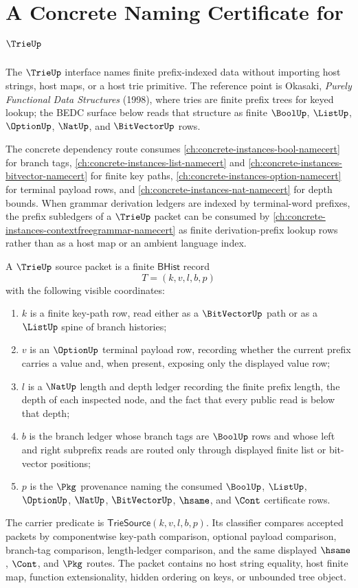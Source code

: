 \chapter{A Concrete Naming Certificate for $\TrieUp$}
\label{ch:concrete-instances-trie-namecert}

The $\TrieUp$ interface names finite prefix-indexed data without importing host
strings, host maps, or a host trie primitive. The reference point is Okasaki,
\emph{Purely Functional Data Structures} (1998), where tries are finite
prefix trees for keyed lookup; the BEDC surface below reads that structure as
finite $\BoolUp$, $\ListUp$, $\OptionUp$, $\NatUp$, and $\BitVectorUp$ rows.

The concrete dependency route consumes
\autoref{ch:concrete-instances-bool-namecert} for branch tags,
\autoref{ch:concrete-instances-list-namecert} and
\autoref{ch:concrete-instances-bitvector-namecert} for finite key paths,
\autoref{ch:concrete-instances-option-namecert} for terminal payload rows, and
\autoref{ch:concrete-instances-nat-namecert} for depth bounds. When grammar
derivation ledgers are indexed by terminal-word prefixes, the prefix subledgers
of a $\TrieUp$ packet can be consumed by
\autoref{ch:concrete-instances-contextfreegrammar-namecert} as finite
derivation-prefix lookup rows rather than as a host map or an ambient language
index.

\begin{definition}\label{def:trie-bhist-source}
A $\TrieUp$ source packet is a finite $\mathsf{BHist}$ record
$$
T=(k,v,l,b,p)
$$
with the following visible coordinates:
\begin{enumerate}
\item $k$ is a finite key-path row, read either as a $\BitVectorUp$ path or as
a $\ListUp$ spine of branch histories;
\item $v$ is an $\OptionUp$ terminal payload row, recording whether the
current prefix carries a value and, when present, exposing only the displayed
value row;
\item $l$ is a $\NatUp$ length and depth ledger recording the finite prefix
length, the depth of each inspected node, and the fact that every public read
is below that depth;
\item $b$ is the branch ledger whose branch tags are $\BoolUp$ rows and whose
left and right subprefix reads are routed only through displayed finite list
or bit-vector positions;
\item $p$ is the $\Pkg$ provenance naming the consumed $\BoolUp$, $\ListUp$,
$\OptionUp$, $\NatUp$, $\BitVectorUp$, $\hsame$, and $\Cont$ certificate rows.
\end{enumerate}
The carrier predicate is $\mathsf{TrieSource}(k,v,l,b,p)$. Its classifier
compares accepted packets by componentwise key-path comparison, optional
payload comparison, branch-tag comparison, length-ledger comparison, and the
same displayed $\hsame$, $\Cont$, and $\Pkg$ routes. The packet contains no
host string equality, host finite map, function extensionality, hidden
ordering on keys, or unbounded tree object.
\end{definition}


